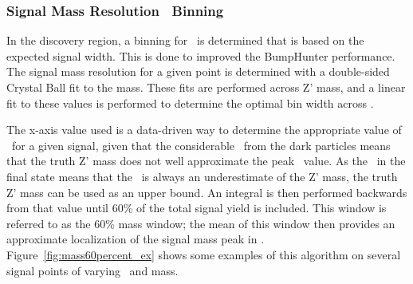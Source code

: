 \subsubsection{Signal Mass Resolution \mt~Binning}
\label{subsec:binning}

In the discovery region, a binning for \mt~is determined that is based on the expected signal width. This is done to improved the BumpHunter performance.
The signal mass resolution for a given point is determined with a double-sided Crystal Ball fit to the mass. 
These fits are performed across Z' mass, and a linear fit to these values is performed to determine the optimal bin width across \mt.

The x-axis value used is a data-driven way to determine the appropriate value of \mt~for a given signal, given that the considerable \met~from the dark particles means that the truth Z' mass does not well approximate the peak \mt~value.
As the \met~in the final state means that the \mt~is always an underestimate of the Z' mass, the truth Z' mass can be used as an upper bound.
An integral is then performed backwards from that value until 60\% of the total signal yield is included. 
This window is referred to as the 60\% mass window; the mean of this window then provides an approximate localization of the signal mass peak in \mt.
Figure~\ref{fig:mass60percent_ex} shows some examples of this algorithm on several signal points of varying \rinv~and mass.
